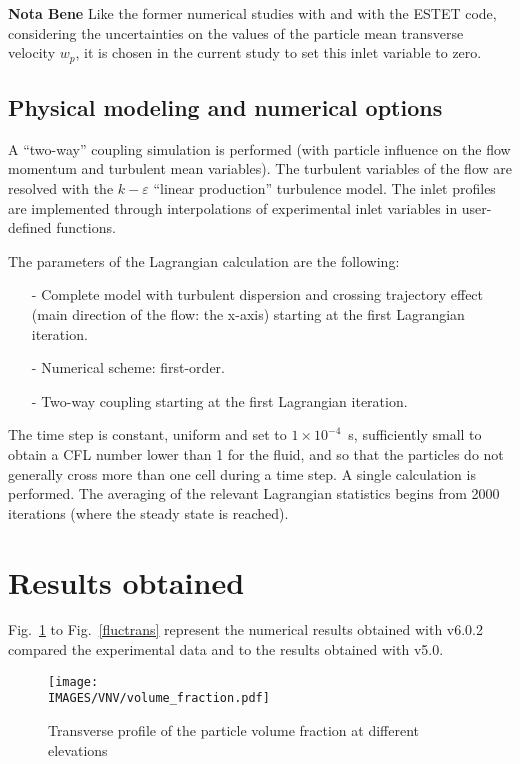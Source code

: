 {\bf Nota Bene} Like the former numerical studies with \CS and with the ESTET code, considering the uncertainties on the values of the particle mean transverse velocity $w_p$, it is chosen in the current study to set this inlet variable to zero.

\subsection{Physical modeling and numerical options}

A ``two-way'' coupling simulation is performed (with particle influence on the flow momentum and turbulent mean variables). The turbulent variables of the flow are resolved with the $k - \varepsilon$ ``linear production'' turbulence model. The inlet profiles are implemented through interpolations of experimental inlet variables in user-defined functions.

The parameters of the Lagrangian calculation are the following:
%
\begin{itemize}
\item[-] Complete model with turbulent dispersion and crossing trajectory effect (main direction of the flow: the x-axis) starting at the first Lagrangian iteration.
\item[-] Numerical scheme: first-order.
\item[-] Two-way coupling starting at the first Lagrangian iteration.
\end{itemize}

The time step is constant, uniform and set to $1 \times 10^{-4}$~s, sufficiently small to obtain a CFL number lower than 1 for the fluid, and so that the particles do not generally cross more than one cell during a time step. A single calculation is performed. The averaging of the relevant Lagrangian statistics begins from 2000 iterations (where the steady state is reached).


\section{Results obtained}


Fig.~\ref{volfrac} to Fig.~\ref{fluctrans} represent the numerical results obtained with \CS v6.0.2  compared the experimental data and to the results obtained with \CS v5.0.

\clearpage
\begin{figure}[H]
\centerline{\texttt{[image: \\IMAGES/VNV/volume\_fraction.pdf]}}
\caption{{Transverse profile of the particle volume fraction at different elevations}}
\label{volfrac}
\end{figure}

